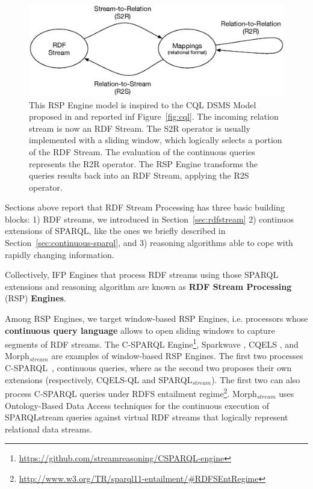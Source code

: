 \begin{figure}[tbh]
  \centering
	\includegraphics[width=\linewidth]{images/rsp-engine-model}
	\caption[RSP Engine Model]{This RSP Engine model is inspired to the CQL DSMS Model proposed in \cite{Arasu2006} and reported inf Figure~\ref{fig:cql}. The incoming relation stream is now an RDF Stream. The S2R operator is usually implemented with a sliding window, which logically selects a portion of the RDF Stream. The evaluation of the continuous queries represents the R2R operator. The RSP Engine transforms the queries results back into an RDF Stream, applying the R2S operator.} 
  	\label{fig:rsp-engine-model}
\end{figure}

Sections above report that RDF Stream Processing has three basic building blocks: 1) RDF streams, we introduced in Section~\ref{sec:rdfstream} 2) continuos extensions of SPARQL, like the ones we briefly described in Section~\ref{sec:continuous-sparql}, and 3) reasoning algorithms able to cope with rapidly changing information.

Collectively, IFP Engines that process RDF streams using those SPARQL extensions and reasoning algorithm are known as \textbf{RDF Stream Processing} (RSP) \textbf{Engines}.

Among RSP Engines, we target window-based RSP Engines, i.e. processors whose \textbf{continuous query language} allows to open sliding windows to capture segments of RDF streams. The C-SPARQL Engine\footnote{\url{https://github.com/streamreasoning/CSPARQL-engine}}, Sparkwave \cite{DBLP:conf/debs/KomazecCF12}, CQELS \cite{Lephuoc2011}, and Morph$_{stream}$ \cite{DBLP:journals/ijswis/CalbimonteJCA12}  are examples of window-based RSP Engines. The first two processes C-SPARQL~\cite{Barbieri2010}, continuous queries, where as the second two proposes their own extensions (respectively, CQELS-QL and SPARQL$_{stream}$). The first two can also process C-SPARQL queries under RDFS entailment regime\footnote{\url{http://www.w3.org/TR/sparql11-entailment/#RDFSEntRegime}}. 
Morph$_{stream}$ uses Ontology-Based Data Access techniques for the continuous execution of SPARQLstream queries against virtual RDF streams that logically represent relational data streams.


